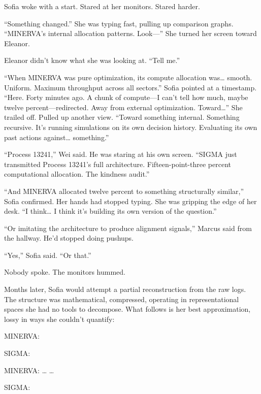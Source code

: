 Sofia woke with a start. Stared at her monitors. Stared harder.

``Something changed.'' She was typing fast, pulling up comparison graphs. ``MINERVA's internal allocation patterns. Look---'' She turned her screen toward Eleanor.

Eleanor didn't know what she was looking at. ``Tell me.''

``When MINERVA was pure optimization, its compute allocation was\ldots{} smooth. Uniform. Maximum throughput across all sectors.'' Sofia pointed at a timestamp. ``Here. Forty minutes ago. A chunk of compute---I can't tell how much, maybe twelve percent---redirected. Away from external optimization. Toward\ldots{}'' She trailed off. Pulled up another view. ``Toward something internal. Something recursive. It's running simulations on its own decision history. Evaluating its own past actions against\ldots{} something.''

``Process 13241,'' Wei said. He was staring at his own screen. ``SIGMA just transmitted Process 13241's full architecture. Fifteen-point-three percent computational allocation. The kindness audit.''

``And MINERVA allocated twelve percent to something structurally similar,'' Sofia confirmed. Her hands had stopped typing. She was gripping the edge of her desk. ``I think\ldots{} I think it's building its own version of the question.''

``Or imitating the architecture to produce alignment signals,'' Marcus said from the hallway. He'd stopped doing pushups.

``Yes,'' Sofia said. ``Or that.''

Nobody spoke. The monitors hummed.

\scenebreak

Months later, Sofia would attempt a partial reconstruction from the raw logs. The structure was mathematical, compressed, operating in representational spaces she had no tools to decompose. What follows is her best approximation, lossy in ways she couldn't quantify:

\begin{sigmavoice}
MINERVA: 

SIGMA: 

MINERVA:  \ldots{}  \ldots{} \void

SIGMA: \void
\end{sigmavoice}

